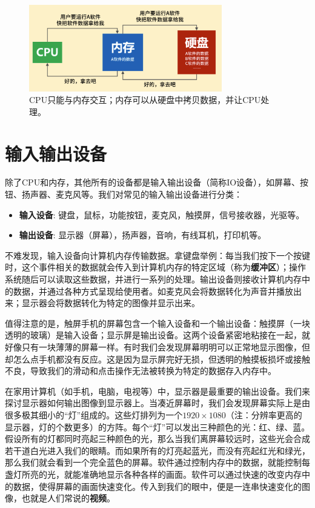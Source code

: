\begin{figure}[htbp]
    \centering
    \includegraphics[width=0.75\textwidth]{images/ch2/cpu_memory_storage}
    \caption{
        CPU只能与内存交互；内存可以从硬盘中拷贝数据，并让CPU处理。
    }
    \label{fig:cpu_memory_storage}
\end{figure}


\section{输入输出设备}\label{sec:arch:io_devices}

除了CPU和内存，其他所有的设备都是输入输出设备（简称IO设备），如屏幕、按钮、扬声器、麦克风等。我们对常见的输入输出设备进行分类：

\begin{itemize}
    \item {
        \textbf{输入设备}: 键盘，鼠标，功能按钮，麦克风，触摸屏，信号接收器，光驱等。
    }
    \item {
        \textbf{输出设备}: 显示器（屏幕），扬声器，音响，有线耳机，打印机等。
    }
\end{itemize}

不难发现，输入设备向计算机内存传输数据。拿键盘举例：每当我们按下一个按键时，这个事件相关的数据就会传入到计算机内存的特定区域（称为\textbf{缓冲区}）；操作系统随后可以读取这些数据，并进行一系列的处理。输出设备则接收计算机内存中的数据，并通过各种方式呈现给使用者。如麦克风会将数据转化为声音并播放出来；显示器会将数据转化为特定的图像并显示出来。

值得注意的是，触屏手机的屏幕包含一个输入设备和一个输出设备：触摸屏（一块透明的玻璃）是输入设备；显示屏是输出设备。这两个设备紧密地粘接在一起，就好像只有一块薄薄的屏幕一样。有时我们会发现屏幕明明可以正常地显示图像，但却怎么点手机都没有反应。这是因为显示屏完好无损，但透明的触摸板损坏或接触不良，导致我们的滑动和点击操作无法被转换为特定的数据存入内存中。

在家用计算机（如手机，电脑，电视等）中，显示器是最重要的输出设备。我们来探讨显示器如何输出图像到显示器上。当凑近屏幕时，我们会发现屏幕实际上是由很多极其细小的“灯”组成的。这些灯排列为一个$1920 \times 1080$（注：分辨率更高的显示器，灯的个数更多）的方阵。每个“灯”可以发出三种颜色的光：红、绿、蓝。假设所有的灯都同时亮起三种颜色的光，那么当我们离屏幕较远时，这些光会合成若干道白光进入我们的眼睛。而如果所有的灯亮起蓝光，而没有亮起红光和绿光，那么我们就会看到一个完全蓝色的屏幕。软件通过控制内存中的数据，就能控制每盏灯所亮的光，就能准确地显示各种各样的画面。软件可以通过快速的改变内存中的数据，使得屏幕的画面快速变化。传入到我们的眼中，便是一连串快速变化的图像，也就是人们常说的\textbf{视频}。



